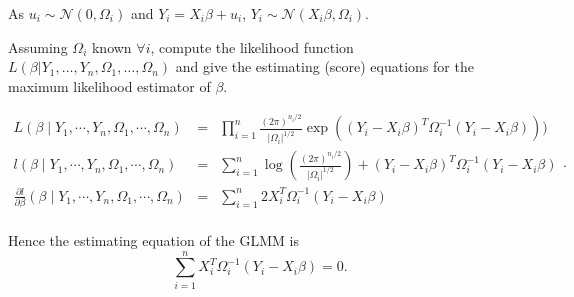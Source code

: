 \documentclass[11pt,a4paper%
addpoints, 
answers%
]{exam}
\begin{document}
\begin{questions}
\begin{solution}
	As $u_i \sim \mathcal{N}(0, \Omega_i)$ and $Y_i = X_i \beta +u_i$, $Y_i \sim \mathcal{N}(X_i \beta, \Omega_i)$.
\end{solution}
\question[3] \label{glmm}Assuming $\Omega_i$ known $\forall i$, compute the likelihood function
$L(\beta | Y_1, \ldots, Y_n, \Omega_1, \ldots,\Omega_n)$
and give the estimating (score) equations for the maximum likelihood estimator
of $\beta$.
\begin{solution}
	$$\begin{array}{ccl}
	L(\beta\mid Y_1, \cdots, Y_n, \Omega_1, \cdots , \Omega_n) & = & \prod_{i = 1}^{n} \frac{(2\pi)^{n_i / 2}}{\lvert \Omega_i\rvert^{1/2}} \exp\left((Y_i - X_i\beta)^T \Omega_i^{-1}(Y_i - X_i\beta)
	 \right))\\
	 l(\beta\mid Y_1, \cdots, Y_n, \Omega_1, \cdots , \Omega_n) & = & \sum_{i = 1}^{n} \log(\frac{(2\pi)^{n_i / 2}}{\lvert \Omega_i\rvert^{1/2}}) + (Y_i - X_i\beta)^T \Omega_i^{-1}(Y_i - X_i\beta)\\
	 \frac{\partial l}{\partial \beta}(\beta\mid Y_1, \cdots, Y_n, \Omega_1, \cdots , \Omega_n) & = & \sum_{i = 1}^{n} 2 X_i^T  \Omega_i^{-1}(Y_i - X_i\beta)\\
	 \end{array} .$$
	 
	 Hence the estimating equation of the GLMM is 
	 $$\sum_{i = 1}^{n} X_i^T \Omega_i^{-1}(Y_i - X_i\beta) = 0. $$  
\end{solution}

\bigskip



\end{questions}
\end{document}
